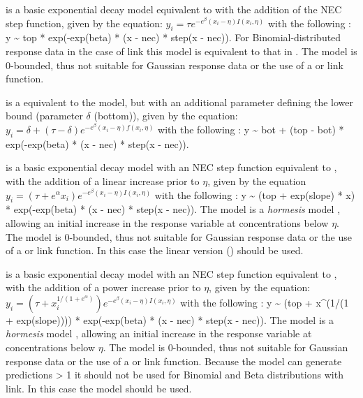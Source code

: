 \documentclass[
  shortnames]{jss}
\begin{document}
 is a basic exponential decay model equivalent to  with the addition of the NEC step function, given by the equation:
\(y_i = \tau e^{-e^{\beta} \left(x_i - \eta \right) I(x_i, \eta)}\)
with the following : y \textasciitilde{} top * exp(-exp(beta) * (x - nec) * step(x - nec)). For Binomial-distributed response data in the case of  link this model is equivalent to that in \citet{Fox2010}. The model is 0-bounded, thus not suitable for Gaussian response data or the use of a  or  link function.

 is a equivalent to the  model, but with an additional parameter defining the lower bound (parameter \(\delta\) (bottom)), given by the equation:
\(y_i = \delta + (\tau - \delta) e^{-e^{\beta} \left(x_i - \eta \right) f(x_i, \eta)}\)
with the following : y \textasciitilde{} bot + (top - bot) * exp(-exp(beta) * (x - nec) * step(x - nec)).

 is a basic exponential decay model with an NEC step function equivalent to , with the addition of a linear increase prior to \(\eta\), given by the equation
\(y_i = (\tau + e^{\alpha} x_i) e^{-e^{\beta} \left(x_i - \eta \right) I(x_i, \eta)}\)
with the following : y \textasciitilde{} (top + exp(slope) * x) * exp(-exp(beta) * (x - nec) * step(x - nec)). The  model is a \emph{hormesis} model \citep{Mattson2008}, allowing an initial increase in the response variable at concentrations below \(\eta\). The model is 0-bounded, thus not suitable for Gaussian response data or the use of a  or  link function. In this case the linear version () should be used.

 is a basic exponential decay model with an NEC step function equivalent to , with the addition of a power increase prior to \(\eta\), given by the equation:
\(y_i = (\tau + x_i^{1/(1+e^{\alpha})}) e^{-e^{\beta} \left(x_i - \eta \right) I(x_i, \eta)}\)
with the following : y \textasciitilde{} (top + x\^{}(1/(1 + exp(slope)))) * exp(-exp(beta) * (x - nec) * step(x - nec)). The  model is a \emph{hormesis} model \citep{Mattson2008}, allowing an initial increase in the response variable at concentrations below \(\eta\). The model is 0-bounded, thus not suitable for Gaussian response data or the use of a  or  link function. Because the model can generate predictions \textgreater{} 1 it should not be used for Binomial and Beta distributions with  link. In this case the  model should be used.
\end{document}
